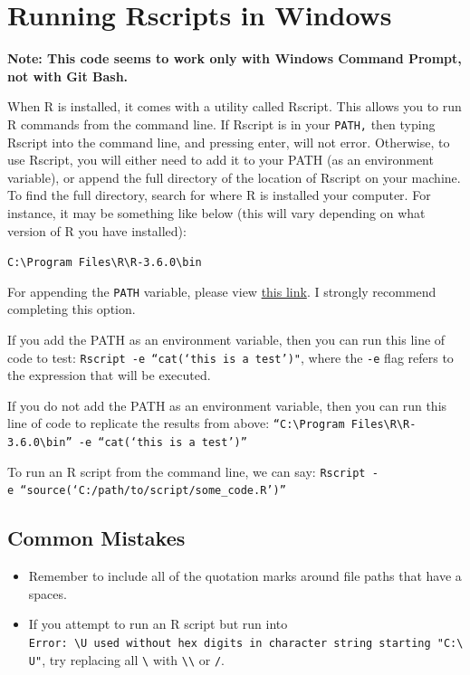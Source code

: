 \documentclass[]{book}
\providecommand{\tightlist}{%
  \setlength{\itemsep}{0pt}\setlength{\parskip}{0pt}}
\begin{document}
\hypertarget{running-rscripts-in-windows}{%
\section{Running Rscripts in Windows}\label{running-rscripts-in-windows}}

\textbf{Note: This code seems to work only with Windows Command Prompt, not with Git Bash.}

When R is installed, it comes with a utility called Rscript. This allows you to run R commands from the command line. If Rscript is in your \texttt{PATH,} then typing Rscript into the command line, and pressing enter, will not error. Otherwise, to use Rscript, you will either need to add it to your PATH (as an environment variable), or append the full directory of the location of Rscript on your machine. To find the full directory, search for where R is installed your computer. For instance, it may be something like below (this will vary depending on what version of R you have installed):

\texttt{C:\textbackslash{}Program\ Files\textbackslash{}R\textbackslash{}R-3.6.0\textbackslash{}bin}

For appending the \texttt{PATH} variable, please view \href{https://www.howtogeek.com/118594/how-to-edit-your-system-path-for-easy-command-line-access/}{this link}. I strongly recommend completing this option.

If you add the PATH as an environment variable, then you can run this line of code to test:
\texttt{Rscript\ -e\ “cat(‘this\ is\ a\ test’)"}, where the \texttt{-e} flag refers to the expression that will be executed.

If you do not add the PATH as an environment variable, then you can run this line of code to replicate the results from above:
\texttt{“C:\textbackslash{}Program\ Files\textbackslash{}R\textbackslash{}R-3.6.0\textbackslash{}bin”\ -e\ “cat(‘this\ is\ a\ test’)”}

To run an R script from the command line, we can say:
\texttt{Rscript\ -e\ “source(‘C:/path/to/script/some\_code.R’)”}

\hypertarget{common-mistakes}{%
\subsection{Common Mistakes}\label{common-mistakes}}

\begin{itemize}
\tightlist
\item
  Remember to include all of the quotation marks around file paths that have a spaces.
\item
  If you attempt to run an R script but run into \texttt{Error:\ \textquotesingle{}\textbackslash{}U\textquotesingle{}\ used\ without\ hex\ digits\ in\ character\ string\ starting\ "\textquotesingle{}C:\textbackslash{}U"}, try replacing all \texttt{\textbackslash{}} with \texttt{\textbackslash{}\textbackslash{}} or \texttt{/}.
\end{itemize}
\end{document}
